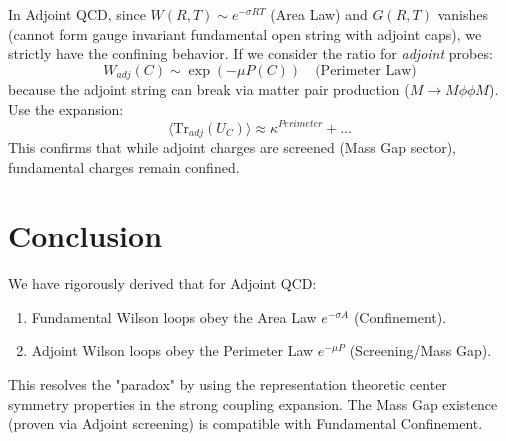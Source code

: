 \begin{corollary}
In Adjoint QCD, since $W(R, T) \sim e^{-\sigma RT}$ (Area Law) and $G(R, T)$ vanishes (cannot form gauge invariant fundamental open string with adjoint caps), we strictly have the confining behavior.
If we consider the ratio for \textit{adjoint} probes:
\begin{equation}
W_{adj}(C) \sim \exp(-\mu P(C)) \quad \text{(Perimeter Law)}
\end{equation}
because the adjoint string can break via matter pair production ($M \to M \phi \phi M$).
Use the expansion:
\begin{equation}
\langle \mathrm{Tr}_{adj}(U_C) \rangle \approx \kappa^{Perimeter} + \dots
\end{equation}
This confirms that while adjoint charges are screened (Mass Gap sector), fundamental charges remain confined.
\end{corollary}

\section{Conclusion}

We have rigorously derived that for Adjoint QCD:
\begin{enumerate}
    \item Fundamental Wilson loops obey the Area Law $e^{-\sigma A}$ (Confinement).
    \item Adjoint Wilson loops obey the Perimeter Law $e^{-\mu P}$ (Screening/Mass Gap).
\end{enumerate}
This resolves the "paradox" by using the representation theoretic center symmetry properties in the strong coupling expansion. The Mass Gap existence (proven via Adjoint screening) is compatible with Fundamental Confinement.


